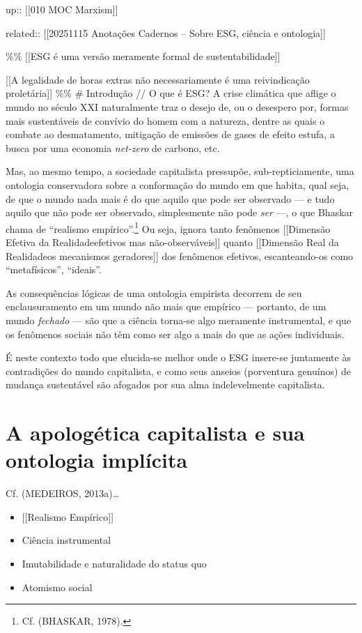 up:: {[}{[}010 MOC Marxism{]}{]}

related:: {[}{[}20251115 Anotações Cadernos -- Sobre ESG, ciência e
ontologia{]}{]}

\%\% {[}{[}ESG é uma versão meramente formal de sustentabilidade{]}{]}

{[}{[}A legalidade de horas extras não necessariamente é uma
reivindicação proletária{]}{]} \%\% \# Introdução // O que é ESG? A
crise climática que aflige o mundo no século XXI naturalmente traz o
desejo de, ou o desespero por, formas mais sustentáveis de convívio do
homem com a natureza, dentre as quais o combate ao desmatamento,
mitigação de emissões de gases de efeito estufa, a busca por uma
economia \emph{net-zero} de carbono, etc.

Mas, ao mesmo tempo, a sociedade capitalista pressupõe,
sub-repticiamente, uma ontologia conservadora sobre a conformação do
mundo em que habita, qual seja, de que o mundo nada mais é do que aquilo
que pode ser observado --- e tudo aquilo que não pode ser observado,
simplesmente não pode \emph{ser} ---, o que Bhaskar chama de ``realismo
empírico''.\footnote{Cf. (BHASKAR, 1978).} Ou seja, ignora tanto
fenômenos {[}{[}Dimensão Efetiva da Realidade\textbar efetivos mas
não-observáveis{]}{]} quanto {[}{[}Dimensão Real da Realidade\textbar os
mecanismos geradores{]}{]} dos fenômenos efetivos, escanteando-os como
``metafísicos'', ``ideais''.

As consequências lógicas de uma ontologia empirista decorrem de seu
enclausuramento em um mundo não mais que empírico --- portanto, de um
mundo \emph{fechado} --- são que a ciência torna-se algo meramente
instrumental, e que os fenômenos sociais não têm como ser algo a mais do
que as ações individuais.

É neste contexto todo que elucida-se melhor onde o ESG insere-se
juntamente às contradições do mundo capitalista, e como seus anseios
(porventura genuínos) de mudança sustentável são afogados por sua alma
indelevelmente capitalista.

\hypertarget{a-apologuxe9tica-capitalista-e-sua-ontologia-impluxedcita}{%
\section{A apologética capitalista e sua ontologia
implícita}\label{a-apologuxe9tica-capitalista-e-sua-ontologia-impluxedcita}}

Cf. (MEDEIROS, 2013a)\ldots{}

\begin{itemize}
\tightlist
\item
  {[}{[}Realismo Empírico{]}{]}
\item
  Ciência instrumental
\item
  Imutabilidade e naturalidade do status quo
\item
  Atomismo social
\end{itemize}

